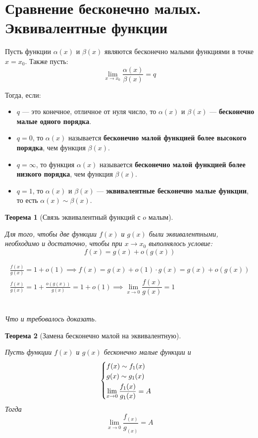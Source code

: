 \documentclass[a4paper,12pt,oneside]{extbook}
\newcommand{\newpar}{$ $\par\nobreak\ignorespaces}
\theoremstyle{numbered}
\theoremstyle{unnumbered}
\theoremstyle{named}
\newtheorem{theorem}{Теорема}[section]
\theoremstyle{unnumbered}
\theoremstyle{named}
\theoremstyle{named}
\theoremstyle{named}
\renewenvironment{proof}[1][]{\breakenv[Доказательство]{\if\relax\detokenize{#1}\relax\else\;\fi}{\textbf{#1}}}{\smallskip\newpar \hfill\textit{Что и требовалось доказать.}}
\begin{document}
\section{Сравнение бесконечно малых. Эквивалентные функции}%
\label{sec:Сравнение бесконечно малых. Эквивалентные функции}

\begin{siderules}
    Пусть функции \(\alpha(x)\) и \(\beta(x)\) являются бесконечно малыми функциями в точке \(x = x_0\). Также пусть:
    \[
        \lim_{x \to x_0}{\dfrac{\alpha(x)}{\beta(x)}} = q
    \]

    Тогда, если:
    \begin{itemize}
        \item {\(q\) — это конечное, отличное от нуля число, то \(\alpha(x)\) и \(\beta(x)\) — \textbf{бесконечно малые одного порядка}.}
        \item {\(q = 0\), то \(\alpha(x)\) называется \textbf{бесконечно малой функцией более высокого порядка}, чем функция \(\beta(x)\).}
        \item {\(q = \infty\), то функция \(\alpha(x)\) называется \textbf{бесконечно малой функцией более низкого порядка}, чем функция \(\beta(x)\).}
        \item {\(q = 1\), то \(\alpha(x)\) и \(\beta(x)\) — \textbf{эквивалентные бесконечно малые функции}, то есть \(\alpha(x) \sim \beta(x)\).}
    \end{itemize}
\end{siderules}

\begin{theorem}[Связь эквивалентный функций с \(o\) малым]
    \newpar
    Для того, чтобы две функции \(f(x)\) и \(g(x)\) были эквивалентными, необходимо и достаточно, чтобы при \(x \to x_0\) выполнялось условие:
    \[
        f(x) = g(x) + o(g(x))
    \]
\end{theorem}

\begin{proof}
    \begin{gather*}
        \frac{f(x)}{g(x)} = 1 + o(1) \implies f(x) = g(x) + o(1) \cdot g(x) = g(x) + o(g(x)) \\
        \frac{f(x)}{g(x)} = 1 + \frac{o(g(x))}{g(x)} = 1 + o(1) \implies \lim_{x \to 0}{\dfrac{f(x)}{g(x)}} = 1
    \end{gather*}
\end{proof}

\begin{theorem}[Замена бесконечно малой на эквивалентную]
    \newpar
    Пусть функции \(f(x)\) и \(g(x)\) бесконечно малые функции и
    \[
        \begin{cases}
            f(x) \sim f_1(x) \\
            \smallskip
            g(x) \sim g_1(x) \\
            \displaystyle \lim_{x \to 0}{\dfrac{f_1(x)}{g_1(x)}} = A
        \end{cases}
    \]
    Тогда
    \[
        \lim_{x \to 0}{\dfrac{f_(x)}{g_(x)}} = A
    \]
\end{theorem}
\end{document}
